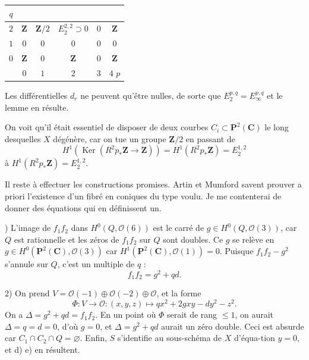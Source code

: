 \documentclass[12pt]{amsart}
\theoremstyle{plain}
\theoremstyle{definition}
\theoremstyle{remark}
\DeclareMathOperator{\Ker}{Ker}
\begin{document}
\begin{center}
\begin{tabular}{c|ccccc}
$q$ & & & & & \\ \hline
$2$ & $\mathbf{Z}$ & $\mathbf{Z}/2$ & $E_2^{2,2} \supset 0$ & $0$ & $\mathbf{Z}$ \\
$1$ & $0$ & $0$ & $0$ & $0$ & $0$ \\
$0$ & $\mathbf{Z}$ & $0$ & $\mathbf{Z}$ & $0$ & $\mathbf{Z}$ \\ \hline
& $0$ & $1$ & $2$ & $3$ & $4$ \quad $p$
\end{tabular}
\end{center}

Les diff\'erentielles $d_r$ ne peuvent qu'\^etre nulles, de sorte que $E_2^{p,q} = E_\infty^{p,q}$ et
le lemme en r\'esulte.

On voit qu'il \'etait essentiel de disposer de deux courbes $C_i \subset \mathbf{P}^2(\mathbf{C})$ le long
desquelles $X$ d\'eg\'en\`ere, car on tue un groupe $\mathbf{Z}/2$ en passant de
\[
H^1(\Ker(R^2 p_* \mathbf{Z} \to \mathbf{Z})) = H^1(R^2 p_* \mathbf{Z}) = E_2^{1,2}
\]
\`a $H^1(R^2 p_* \mathbf{Z}) = E_2^{1,2}$.

Il reste \`a effectuer les constructions promises. Artin et Mumford savent prouver
a priori l'existence d'un fibr\'e en coniques du type voulu. Je me contenterai de
donner des \'equations qui en d\'efinissent un.

) L'image de $f_1 f_2$ dans $H^0(Q, \mathcal{O}(6))$ est le carr\'e de $g \in H^0(Q, \mathcal{O}(3))$,
car $Q$ est rationnelle et les z\'eros de $f_1 f_2$ sur $Q$ sont doubles. Ce $g$ se rel\`eve
en $g \in H^0(\mathbf{P}^2(\mathbf{C}), \mathcal{O}(3))$ car $H^1(\mathbf{P}^2(\mathbf{C}), \mathcal{O}(1)) = 0$. Puisque $f_1 f_2 - g^2$ s'annule
sur $Q$, c'est un multiple de $q$ :
\[
f_1 f_2 = g^2 + qd.
\]

2) On prend $V = \mathcal{O}(-1) \oplus \mathcal{O}(-2) \oplus \mathcal{O}$, et la forme
\[
\Phi: V \to \mathcal{O}: (x, y, z) \longmapsto qx^2 + 2gxy - dy^2 - z^2.
\]
On a $\Delta = g^2 + qd = f_1 f_2$. En un point o\`u $\Phi$ serait de rang $\leqslant 1$, on aurait
$\Delta = q = d = 0$, d'o\`u $g = 0$, et $\Delta = g^2 + qd$ aurait un z\'ero double. Ceci est
absurde car $C_1 \cap C_2 \cap Q = \varnothing$. Enfin, $S$ s'identifie au sous-sch\'ema de $X$ d'\'equa-\linebreak tion $y = 0$, et d) e) en r\'esultent.
\end{document}
